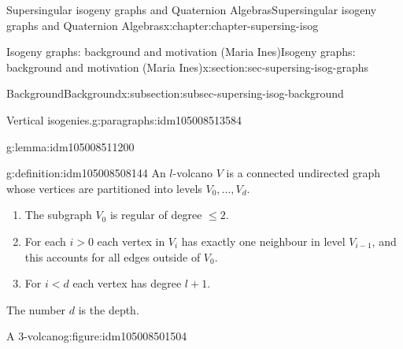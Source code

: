 \documentclass[oneside,10pt,]{book}
\numberwithin{equation}{section}
\newcommand{\lt}{<}
\newcommand{\gt}{>}
\begin{document}
\begin{chapterptx}{Supersingular isogeny graphs and Quaternion Algebras}{}{Supersingular isogeny graphs and Quaternion Algebras}{}{}{x:chapter:chapter-supersing-isog}
\begin{sectionptx}{Isogeny graphs: background and motivation (Maria Ines)}{}{Isogeny graphs: background and motivation (Maria Ines)}{}{}{x:section:sec-supersing-isog-graphs}
\begin{subsectionptx}{Background}{}{Background}{}{}{x:subsection:subsec-supersing-isog-background}
\begin{paragraphs}{Vertical isogenies.}{g:paragraphs:idm105008513584}
\begin{lemma}{}{}{g:lemma:idm105008511200}
\end{lemma}
\begin{definition}{}{g:definition:idm105008508144}%
An \(l\)-volcano \(V\) is a connected undirected graph whose vertices are partitioned into levels \(V_0, \ldots, V_d\).%
\begin{enumerate}
\item{}The subgraph \(V_0\) is regular of degree \(\le 2\).%
\item{}For each \(i \gt 0\) each vertex in \(V_i\) has exactly one neighbour in level \(V_{i-1}\), and this accounts for all edges outside of \(V_0\).%
\item{}For \(i \lt d\) each vertex has degree \(l+1\).%
\end{enumerate}
The number \(d\) is the depth.%
\end{definition}
\begin{figureptx}{A \(3\)-volcano}{g:figure:idm105008501504}{}%
\begin{image}{0}{1}{0}%
\end{image}
\end{figureptx}
\end{paragraphs}
\end{subsectionptx}
\end{sectionptx}
\end{chapterptx}
\end{document}
